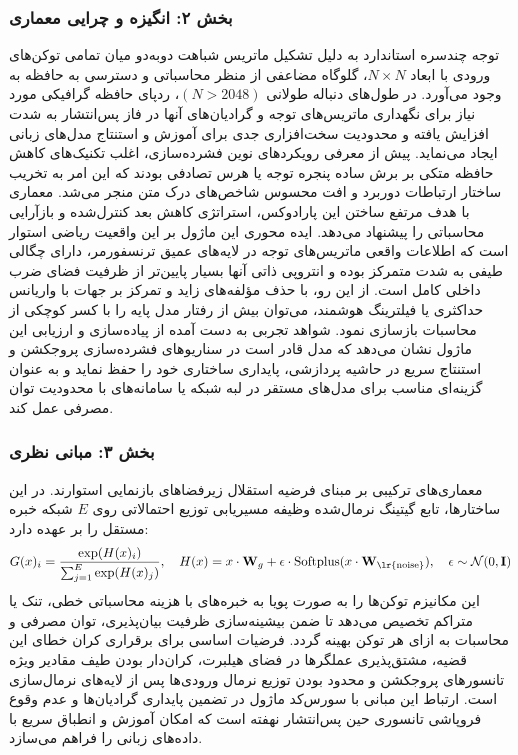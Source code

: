 \subsubsection*{بخش ۲: انگیزه و چرایی معماری }
توجه چندسره استاندارد  به دلیل تشکیل ماتریس شباهت دو‌به‌دو میان تمامی توکن‌های ورودی با ابعاد $N \times N$، گلوگاه مضاعفی از منظر محاسباتی و دسترسی به حافظه به وجود می‌آورد. در طول‌های دنباله طولانی $(N > 2048)$، ردپای حافظه گرافیکی مورد نیاز برای نگهداری ماتریس‌های توجه و گرادیان‌های آنها در فاز پس‌انتشار به شدت افزایش یافته و محدودیت سخت‌افزاری جدی برای آموزش و استنتاج مدل‌های زبانی ایجاد می‌نماید.
پیش از معرفی رویکردهای نوین فشرده‌سازی، اغلب تکنیک‌های کاهش حافظه متکی بر برش ساده پنجره توجه  یا هرس تصادفی بودند که این امر به تخریب ساختار ارتباطات دوربرد و افت محسوس شاخص‌های درک متن منجر می‌شد. معماری  با هدف مرتفع ساختن این پارادوکس، استراتژی کاهش بعد کنترل‌شده و بازآرایی محاسباتی را پیشنهاد می‌دهد.
ایده محوری این ماژول بر این واقعیت ریاضی استوار است که اطلاعات واقعی ماتریس‌های توجه در لایه‌های عمیق ترنسفورمر، دارای چگالی طیفی به شدت متمرکز بوده و انتروپی ذاتی آنها بسیار پایین‌تر از ظرفیت فضای ضرب داخلی کامل است. از این رو، با حذف مؤلفه‌های زاید و تمرکز بر جهات با واریانس حداکثری یا فیلترینگ هوشمند، می‌توان بیش از  رفتار مدل پایه را با کسر کوچکی از محاسبات بازسازی نمود.
شواهد تجربی به دست آمده از پیاده‌سازی و ارزیابی این ماژول نشان می‌دهد که مدل قادر است در سناریوهای فشرده‌سازی پروجکشن و استنتاج سریع در حاشیه پردازشی، پایداری ساختاری خود را حفظ نماید و به عنوان گزینه‌ای مناسب برای مدل‌های مستقر در لبه شبکه یا سامانه‌های با محدودیت توان مصرفی عمل کند.

\subsubsection*{بخش ۳: مبانی نظری }
معماری‌های ترکیبی بر مبنای فرضیه استقلال زیرفضاهای بازنمایی استوارند. در این ساختارها، تابع گیتینگ نرمال‌شده وظیفه مسیریابی توزیع احتمالاتی روی $E$ شبکه خبره مستقل را بر عهده دارد:
$$G(x)_i = \frac{\exp(H(x)_i)}{\sum_{j=1}^E \exp(H(x)_j)}, \quad H(x) = x \cdot \mathbf{W}_g + \epsilon \cdot \operatorname{Softplus}(x \cdot \mathbf{W}_{\text{\lr{noise}}}), \quad \epsilon \sim \mathcal{N}(0, \mathbf{I})$$
این مکانیزم توکن‌ها را به صورت پویا به خبره‌های با هزینه محاسباتی خطی، تنک یا متراکم تخصیص می‌دهد تا ضمن بیشینه‌سازی ظرفیت بیان‌پذیری، توان مصرفی و محاسبات به ازای هر توکن بهینه گردد.
فرضیات اساسی برای برقراری کران خطای این قضیه، مشتق‌پذیری عملگرها در فضای هیلبرت، کران‌دار بودن طیف مقادیر ویژه تانسورهای پروجکشن و محدود بودن توزیع نرمال ورودی‌ها پس از لایه‌های نرمال‌سازی  است.
ارتباط این مبانی با سورس‌کد ماژول  در تضمین پایداری گرادیان‌ها و عدم وقوع فروپاشی تانسوری حین پس‌انتشار نهفته است که امکان آموزش و انطباق سریع با داده‌های زبانی را فراهم می‌سازد.

